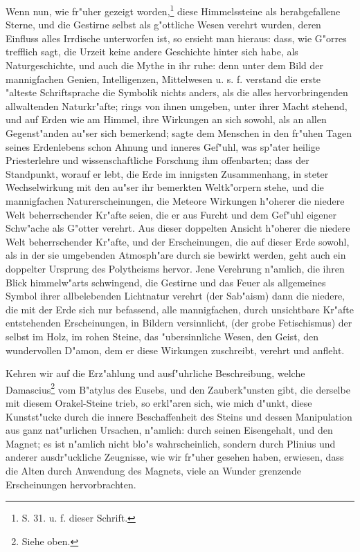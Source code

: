 \documentclass[a4paper, 11pt, oneside, polutonikogreek, german]{article}
\begin{document}
Wenn nun, wie fr"uher gezeigt worden,\footnote{S. 31. u. f. dieser Schrift.} diese Himmelssteine als herabgefallene Sterne, und die Gestirne selbst als g"ottliche Wesen verehrt wurden, deren Einfluss alles Irrdische unterworfen ist, so ersieht man hieraus: dass, wie G"orres trefflich sagt, die Urzeit keine andere Geschichte hinter sich habe, als Naturgeschichte, und auch die Mythe in ihr ruhe: denn unter dem Bild der mannigfachen Genien, Intelligenzen, Mittelwesen u. s. f. verstand die erste "alteste Schriftsprache die Symbolik nichts anders, als die alles hervorbringenden allwaltenden Naturkr"afte; rings von ihnen umgeben, unter ihrer Macht stehend, und auf Erden wie am Himmel, ihre Wirkungen an sich sowohl, als an allen Gegenst"anden au"ser sich bemerkend; sagte dem Menschen in den fr"uhen Tagen seines Erdenlebens schon Ahnung und inneres Gef"uhl, was sp"ater heilige Priesterlehre und wissenschaftliche Forschung ihm offenbarten; dass der Standpunkt, worauf er lebt, die Erde im innigsten Zusammenhang, in steter Wechselwirkung mit den au"ser ihr bemerkten Weltk"orpern stehe, und die mannigfachen Naturerscheinungen, die Meteore Wirkungen h"oherer die niedere Welt beherrschender Kr"afte seien, die er aus Furcht und dem Gef"uhl eigener Schw"ache als G"otter verehrt. Aus dieser doppelten Ansicht h"oherer die niedere Welt beherrschender Kr"afte, und der Erscheinungen, die auf dieser Erde sowohl, als in der sie umgebenden Atmosph"are durch sie bewirkt werden, geht auch ein doppelter Ursprung des Polytheisms hervor. Jene Verehrung n"amlich, die ihren Blick himmelw"arts schwingend, die Gestirne und das Feuer als allgemeines Symbol ihrer allbelebenden Lichtnatur verehrt (der Sab"aism) dann die niedere, die mit der Erde sich nur befassend, alle mannigfachen, durch unsichtbare Kr"afte entstehenden Erscheinungen, in Bildern versinnlicht, (der grobe Fetischismus) der selbst im Holz, im rohen Steine, das "ubersinnliche Wesen, den Geist, den wundervollen D"amon, dem er diese Wirkungen zuschreibt, verehrt und anfleht.

Kehren wir auf die Erz"ahlung und ausf"uhrliche Beschreibung, welche Damascius\footnote{Siehe oben.} vom B"atylus des Eusebs, und den Zauberk"unsten gibt, die derselbe mit diesem Orakel-Steine trieb, so erkl"aren sich, wie mich d"unkt, diese Kunstst"ucke durch die innere Beschaffenheit des Steins und dessen Manipulation aus ganz nat"urlichen Ursachen, n"amlich: durch seinen Eisengehalt, und den Magnet; es ist n"amlich nicht blo"s wahrscheinlich, sondern durch Plinius und anderer ausdr"uckliche Zeugnisse, wie wir fr"uher gesehen haben, erwiesen, dass die Alten durch Anwendung des Magnets, viele an Wunder grenzende Erscheinungen hervorbrachten.
\end{document}

